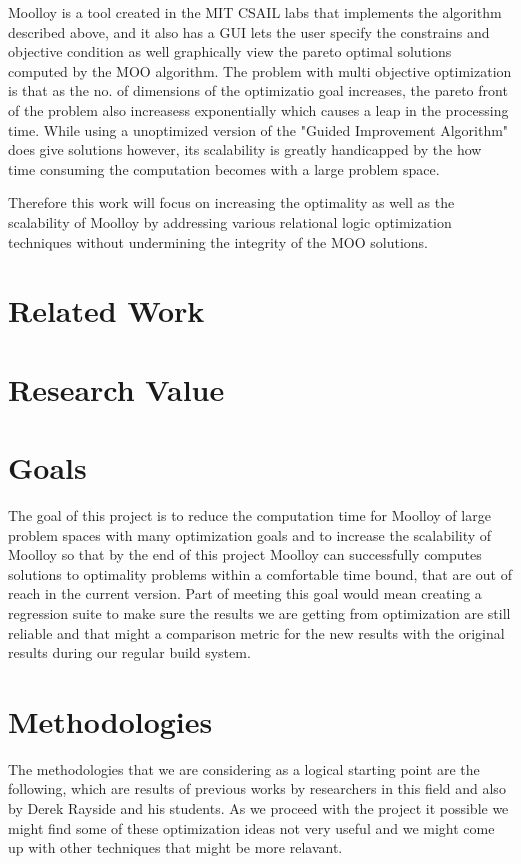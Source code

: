 \documentclass[11pt]{article}
\begin{document}
Moolloy is a tool created in the MIT CSAIL labs that implements the algorithm described above, and it also has a GUI lets the user specify the constrains and objective condition as well graphically view the pareto optimal solutions computed by the MOO algorithm. The problem with multi objective optimization is that as the no. of dimensions of the optimizatio goal increases, the pareto front of the problem also increasess  exponentially which causes a leap in the processing time. While using a unoptimized version of the "Guided Improvement Algorithm" does give solutions however, its scalability is greatly handicapped by the how time consuming the computation becomes with a large problem space.

Therefore this work will focus on increasing the optimality as well as the scalability of Moolloy by addressing various relational logic optimization techniques without undermining the integrity of the MOO solutions.

\section{Related Work}

\section{Research Value} 

\section{Goals}
The goal of this project is to reduce the computation time for Moolloy of large problem spaces with many optimization goals and to increase the scalability of Moolloy so that by the end of this project Moolloy can successfully computes solutions to optimality problems within a comfortable time bound, that are out of reach in the current version. Part of meeting this  goal would mean creating a regression suite to make sure the results we are getting from optimization are still reliable and that might a comparison metric for the new results with the original results during our regular build system.

\section{Methodologies}
The methodologies that we are considering as a logical starting point are the following, which are results of previous works by researchers in this field and also by Derek Rayside and his students. As we proceed with the project it possible we might find some of these optimization ideas not very useful and we might come up with other techniques that might be more relavant.
\end{document}
